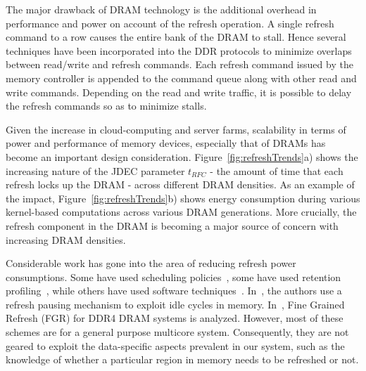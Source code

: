 The major drawback of DRAM technology is the additional overhead in performance and power on account of the refresh operation. A single refresh command to a row causes the entire bank of the DRAM to stall. Hence several techniques have been incorporated into the DDR protocols to minimize overlaps between read/write and refresh commands.
Each refresh command issued by the memory controller is appended to the command queue along with other read and write commands. Depending on the read and write traffic, it is possible to delay the refresh commands so as to minimize stalls. %

Given the increase in cloud-computing and server farms, scalability in terms of power and performance of memory devices, especially that of DRAMs has become an important design consideration. %
Figure~\ref{fig:refreshTrends}a) shows the increasing nature of the JDEC parameter $t_{RFC}$ - the amount of time that each refresh locks up the DRAM - across different DRAM densities. As an example of the impact, Figure~\ref{fig:refreshTrends}b) shows energy consumption during various kernel-based computations across various DRAM generations. More crucially, the refresh component in the DRAM is becoming a major source of concern with increasing DRAM densities.

Considerable work has gone into the area of reducing refresh power consumptions. Some have used scheduling policies~\cite{Stuecheli2010}, some have used retention profiling~\cite{Liu2012}, while others have used software techniques~\cite{Liu2012}. In~\cite{Nair2013}, the authors use a refresh pausing mechanism to exploit idle cycles in memory. In~\cite{Mukundan2013}, Fine Grained Refresh (FGR) for DDR4 DRAM systems is analyzed. 
However, most of these schemes are for a general purpose multicore system. Consequently, they are not geared to exploit the data-specific aspects prevalent in our system, such as the knowledge of whether a particular region in memory needs to be refreshed or not.


